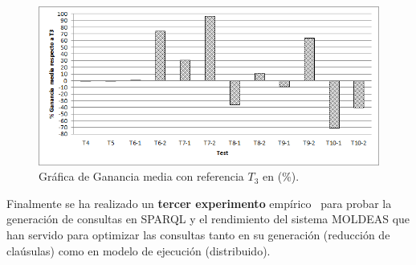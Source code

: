 \documentclass[a4paper,final,11pt,fleqn,twoside]{book}  %
\begin{document}
\begin{figure}[!htb]
\centering
	\includegraphics[width=14cm]{./images/phd/experimentation/t3-t10-ganancia}
\caption{Gráfica de Ganancia media con referencia $T_3$ en (\%).}
\label{fig:results-graph-3}
\end{figure}




Finalmente se ha realizado un \textbf{tercer experimento} empírico~\cite{Alvarez:2011:QEM:2075561.2075618} para probar la generación de consultas en SPARQL 
y el rendimiento del sistema MOLDEAS que han servido para optimizar las consultas tanto en su generación (reducción de claúsulas) como en modelo de ejecución (distribuido).
\end{document}

